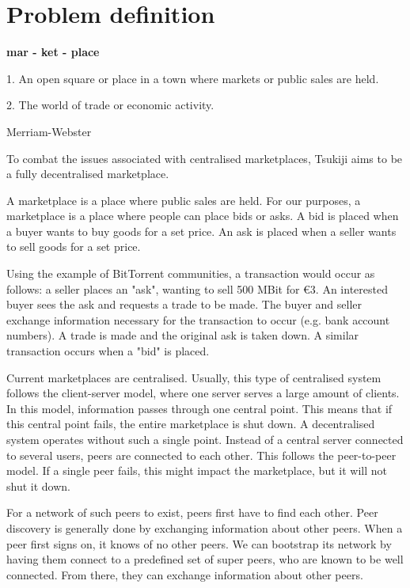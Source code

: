 \section{Problem definition}
\epigraph{\textbf{mar - ket - place}

1. An open square or place in a town where markets or public sales are held.

2. The world of trade or economic activity.}{Merriam-Webster}

To combat the issues associated with centralised marketplaces, Tsukiji aims to be a fully decentralised marketplace.

A marketplace is a place where public sales are held.
For our purposes, a marketplace is a place where people can place bids or asks.
A bid is placed when a buyer wants to buy goods for a set price.
An ask is placed when a seller wants to sell goods for a set price.

Using the example of BitTorrent communities, a transaction would occur as follows: a seller places an "ask", wanting to sell 500 MBit for €3.
An interested buyer sees the ask and requests a trade to be made.
The buyer and seller exchange information necessary for the transaction to occur (e.g. bank account numbers).
A trade is made and the original ask is taken down.
A similar transaction occurs when a "bid" is placed.

Current marketplaces are centralised.
Usually, this type of centralised system follows the client-server model, where one server serves a large amount of clients.
In this model, information passes through one central point.
This means that if this central point fails, the entire marketplace is shut down.
A decentralised system operates without such a single point.
Instead of a central server connected to several users, peers are connected to each other.
This follows the peer-to-peer model.
If a single peer fails, this might impact the marketplace, but it will not shut it down.

For a network of such peers to exist, peers first have to find each other.
Peer discovery is generally done by exchanging information about other peers.
When a peer first signs on, it knows of no other peers.
We can bootstrap its network by having them connect to a predefined set of super peers, who are known to be well connected.
From there, they can exchange information about other peers.